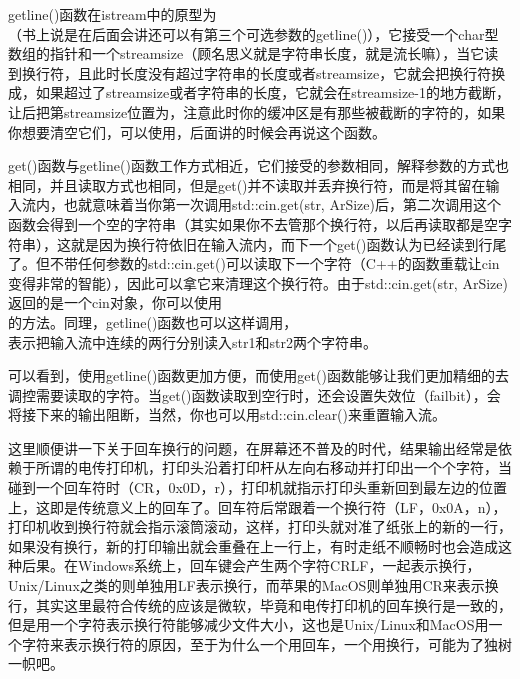 getline()函数在istream中的原型为\\ （书上说是在后面会讲还可以有第三个可选参数的getline()），它接受一个char型数组的指针和一个streamsize（顾名思义就是字符串长度，就是流长嘛），当它读到换行符，且此时长度没有超过字符串的长度或者streamsize，它就会把换行符换成\leftqm{}\rightqm，如果超过了streamsize或者字符串的长度，它就会在streamsize-1的地方截断，让后把第streamsize位置为\leftqm{}\rightqm，注意此时你的缓冲区是有那些被截断的字符的，如果你想要清空它们，可以使用，后面讲的时候会再说这个函数。

get()函数与getline()函数工作方式相近，它们接受的参数相同，解释参数的方式也相同，并且读取方式也相同，但是get()并不读取并丢弃换行符，而是将其留在输入流内，也就意味着当你第一次调用std::cin.get(str, ArSize)后，第二次调用这个函数会得到一个空的字符串（其实如果你不去管那个换行符，以后再读取都是空字符串），这就是因为换行符依旧在输入流内，而下一个get()函数认为已经读到行尾了。但不带任何参数的std::cin.get()可以读取下一个字符（C++的函数重载让cin变得非常的智能），因此可以拿它来清理这个换行符。由于std::cin.get(str, ArSize)返回的是一个cin对象，你可以使用\\ 的方法。同理，getline()函数也可以这样调用，\\ 表示把输入流中连续的两行分别读入str1和str2两个字符串。

可以看到，使用getline()函数更加方便，而使用get()函数能够让我们更加精细的去调控需要读取的字符。当get()函数读取到空行时，还会设置失效位（failbit），会将接下来的输出阻断，当然，你也可以用std::cin.clear()来重置输入流。\dpar

这里顺便讲一下关于回车换行的问题，在屏幕还不普及的时代，结果输出经常是依赖于所谓的电传打印机，打印头沿着打印杆从左向右移动并打印出一个个字符，当碰到一个回车符时（CR，0x0D，\mybackslash r），打印机就指示打印头重新回到最左边的位置上，这即是传统意义上的回车了。回车符后常跟着一个换行符（LF，0x0A，\mybackslash n），打印机收到换行符就会指示滚筒滚动，这样，打印头就对准了纸张上的新的一行，如果没有换行，新的打印输出就会重叠在上一行上，有时走纸不顺畅时也会造成这种后果。在Windows系统上，回车键会产生两个字符CRLF，一起表示换行，Unix/Linux之类的则单独用LF表示换行，而苹果的MacOS则单独用CR来表示换行，其实这里最符合传统的应该是微软，毕竟和电传打印机的回车换行是一致的，但是用一个字符表示换行符能够减少文件大小，这也是Unix/Linux和MacOS用一个字符来表示换行符的原因，至于为什么一个用回车，一个用换行，可能为了独树一帜吧。

